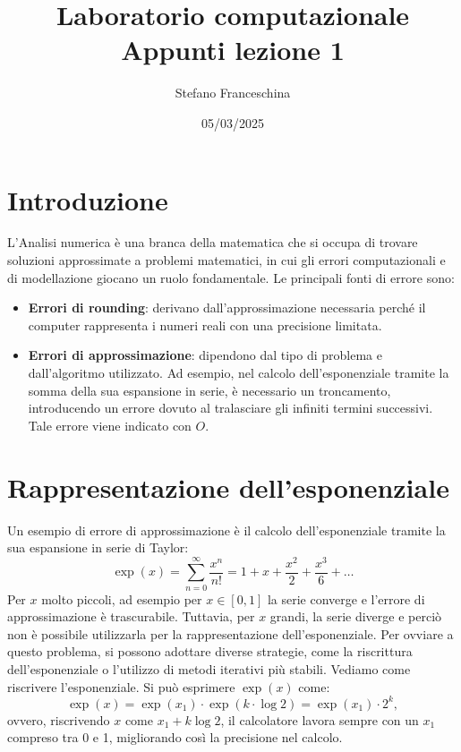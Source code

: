 \documentclass[letterpaper,12pt]{article}
\title{Laboratorio computazionale \\[1ex] \large Appunti lezione 1}
\author{Stefano Franceschina}
\date{05/03/2025}
\begin{document}
\maketitle

\section{Introduzione}
    L'Analisi numerica è una branca della matematica che si occupa di trovare soluzioni approssimate a problemi matematici, 
    in cui gli errori computazionali e di modellazione giocano un ruolo fondamentale. Le principali fonti di errore sono:
    \begin{itemize}
        \item \textbf{Errori di rounding}: derivano dall'approssimazione necessaria perché il computer rappresenta i numeri 
        reali con una precisione limitata.
        \item \textbf{Errori di approssimazione}: dipendono dal tipo di problema e dall'algoritmo utilizzato. Ad esempio, 
        nel calcolo dell'esponenziale tramite la somma della sua espansione in serie, è necessario un troncamento, 
        introducendo un errore dovuto al tralasciare gli infiniti termini successivi. Tale errore viene indicato con $O$.
    \end{itemize}

\section{Rappresentazione dell'esponenziale}
    Un esempio di errore di approssimazione è il calcolo dell'esponenziale tramite la sua espansione in serie di Taylor:
    \[
        \exp(x) = \sum_{n=0}^{\infty} \frac{x^n}{n!} = 1 + x + \frac{x^2}{2} + \frac{x^3}{6} + \ldots
    \]
    Per $x$ molto piccoli, ad esempio per $x \in [0, 1]$ la serie converge e l'errore di approssimazione è 
    trascurabile. Tuttavia, per $x$ grandi, la serie diverge e perciò non è possibile utilizzarla per la 
    rappresentazione dell'esponenziale. Per ovviare a questo problema, si possono adottare diverse strategie, 
    come la riscrittura dell'esponenziale o l'utilizzo di metodi iterativi più 
    stabili. Vediamo come riscrivere l'esponenziale. Si può esprimere $\exp(x)$ come:
    \[
        \exp(x) = \exp(x_1) \cdot \exp(k \cdot \log 2) = \exp(x_1) \cdot 2^k,
    \]
    ovvero, riscrivendo $x$ come $x_1 + k \log 2$, il calcolatore lavora sempre con un $x_1$ compreso tra 0 e 1, 
    migliorando così la precisione nel calcolo.
\end{document}
